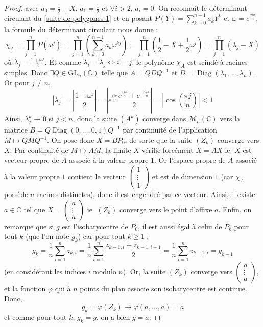 \begin{proof}
		avec $a_0 = \frac{1}{2} - X$, $a_1 = \frac{1}{2}$ et $\forall i > 2, \, a_i = 0$. On reconnaît le déterminant circulant du \cref{suite-de-polygones-1} et en posant $P(Y) = \sum_{k=0}^{n-1} a_k Y^k$ et $\omega = e^{\frac{2i\pi}{n}}$, la formule du déterminant circulant nous donne :
		\[ \chi_A = \prod_{j=1}^n P(\omega^j) = \prod_{j=1}^n \left( \sum_{k=0}^{n-1} a_k \omega^{kj} \right) = \prod_{j=1}^n \left( \frac{1}{2} - X + \frac{1}{2} \omega^j \right) = \prod_{j=1}^n (\lambda_j - X) \]
		où $\lambda_j = \frac{1+\omega^j}{2}$. Et comme $\lambda_i = \lambda_j \iff i = j$, le polynôme $\chi_A$ est scindé à racines simples. Donc $\exists Q \in \mathrm{GL}_n(\mathbb{C})$ telle que $A=QDQ^{-1}$ et $D = \operatorname{Diag}(\lambda_1, \dots, \lambda_n)$.
		Or pour $j \neq n$,
		\[ |\lambda_j| = \left| \frac{1 + \omega^j}{2} \right| = \left| e^{\frac{ij \pi}{n}} \frac{e^{\frac{ij \pi}{n}} + e^{-\frac{ij \pi}{n}}}{2} \right| = \left| \cos \left( \frac{\pi j}{n} \right) \right| < 1 \]
		Ainsi, $\lambda_j^k \longrightarrow 0$ si $j < n$, donc la suite $(A^k)$ converge dans $\mathcal{M}_n(\mathbb{C})$ vers la matrice $B = Q \operatorname{Diag}(0, \dots, 0, 1)Q^{-1}$ par continuité de l'application $M \mapsto QMQ^{-1}$.
		\newpar
		On pose donc $X = B P_0$, de sorte que la suite $(Z_k)$ converge vers $X$. Par continuité de $M \mapsto AM$, la limite $X$ vérifie forcément $X = AX$ ie. $X$ est vecteur propre de $A$ associé à la valeur propre $1$. Or l'espace propre de $A$ associé à la valeur propre $1$ contient le vecteur $\begin{pmatrix} 1 \\ \vdots \\ 1 \end{pmatrix}$ et est de dimension $1$ (car $\chi_A$ possède $n$ racines distinctes), donc il est engendré par ce vecteur. Ainsi, il existe $a \in \mathbb{C}$ tel que $X = \begin{pmatrix} a \\ \vdots \\ a \end{pmatrix}$ ie. $(Z_k)$ converge vers le point d'affixe $a$.
		\newpar
		Enfin, on remarque que si $g$ est l'isobarycentre de $P_0$, il est aussi égal à celui de $P_k$ pour tout $k$ (que l'on note $g_k$) car pour tout $k \geq 1$ :
		\[ g_k = \frac{1}{n} \sum_{i=1}^n z_{k,i} = \frac{1}{n} \sum_{i=1}^n \frac{z_{k-1,i} + z_{k-1,i+1}}{2} = \frac{1}{n} \sum_{i=1}^n z_{k-1,i} = g_{k-1} \]
		(en considérant les indices $i$ modulo $n$). Or, la suite $(Z_k)$ converge vers $\begin{pmatrix} a \\ \vdots \\ a \end{pmatrix}$, et la fonction $\varphi$ qui à $n$ points du plan associe son isobarycentre est continue. Donc,
		\[ g_k = \varphi(Z_k) \longrightarrow \varphi(a, \dots, a) = a \]
		et comme pour tout $k$, $g_k = g$, on a bien $g = a$.
	\end{proof}

